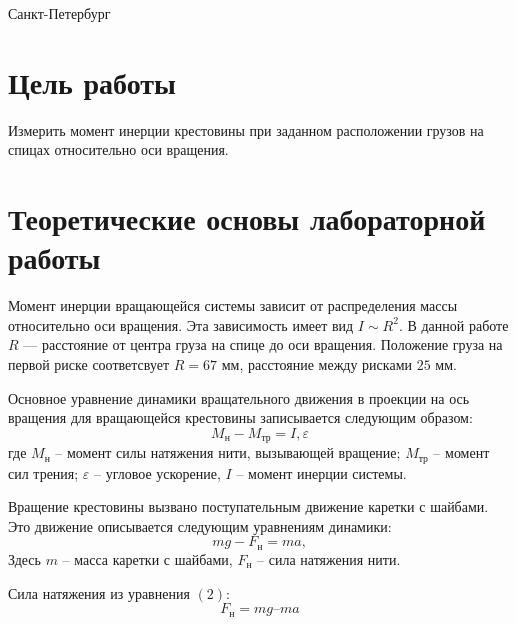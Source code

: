 \documentclass[12pt]{article}
\begin{document}
\par\bigskip\par\bigskip\par\bigskip\par\bigskip\par\bigskip\par\bigskip\par\bigskip\par\bigskip\par\bigskip\par\bigskip     
\begin{center}
\large
Санкт-Петербург
\par{}
\end{center}
\newpage

\section*{Цель работы}
Измерить момент инерции крестовины при заданном расположении грузов на спицах относительно оси вращения.
\section*{Теоретические основы лабораторной работы}
Момент инерции вращающейся системы зависит от распределения массы относительно оси вращения. Эта зависимость имеет вид $I\sim R^2$. В данной работе $R$ --- расстояние от центра груза на спице до оси вращения. Положение груза на первой риске соответсвует $R = 67$ мм, расстояние между рисками $25$ мм.

Основное уравнение динамики вращательного движения в проекции на ось вращения для вращающейся крестовины записывается следующим образом:
\begin{equation}
M_{н}-M_{тр}=I,\varepsilon
\end{equation}
где $M_{н}$ – момент силы натяжения нити, вызывающей вращение; $M_{тр}$ – момент сил трения; $\varepsilon$ – угловое ускорение, $I$ – момент инерции системы.

Вращение крестовины вызвано поступательным движение каретки с шайбами. Это движение описывается следующим  уравнениям динамики: 
\begin{equation}
mg-F_{н}=ma,	
\end{equation}
Здесь $m$ – масса каретки с шайбами, $F_{н}$ – сила натяжения нити. 

Сила натяжения из уравнения $(2)$:
\begin{equation}
F_{н} = mg – ma	
\end{equation}
\end{document}
